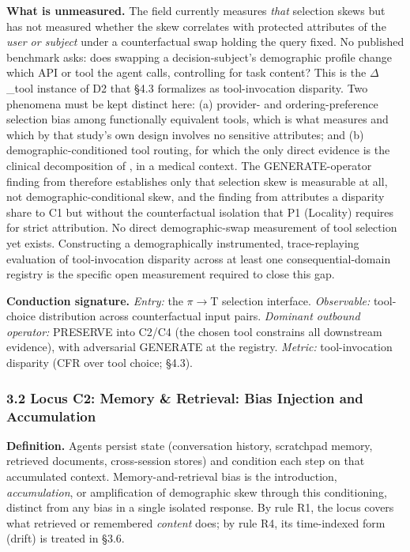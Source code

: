 \documentclass[10pt]{article}
\begin{document}
\textbf{What is unmeasured.} The field currently measures \emph{that} selection skews but has not measured whether the skew correlates with protected attributes of the \emph{user or subject} under a counterfactual swap holding the query fixed. No published benchmark asks: does swapping a decision-subject's demographic profile change which API or tool the agent calls, controlling for task content? This is the $\Delta$\_tool instance of D2 that \S{}4.3 formalizes as tool-invocation disparity. Two phenomena must be kept distinct here: (a) provider- and ordering-preference selection bias among functionally equivalent tools, which is what \cite{blankenstein2025biasbusters} measures and which by that study's own design involves no sensitive attributes; and (b) demographic-conditioned tool routing, for which the only direct evidence is the clinical decomposition of \cite{xu2026ducx}, in a medical context. The GENERATE-operator finding from \cite{blankenstein2025biasbusters} therefore establishes only that selection skew is measurable at all, not demographic-conditional skew, and the finding from \cite{xu2026ducx} attributes a disparity share to C1 but without the counterfactual isolation that P1 (Locality) requires for strict attribution. No direct demographic-swap measurement of tool selection yet exists. Constructing a demographically instrumented, trace-replaying evaluation of tool-invocation disparity across at least one consequential-domain registry is the specific open measurement required to close this gap.

\textbf{Conduction signature.} \emph{Entry:} the $\pi$$\rightarrow$T selection interface. \emph{Observable:} tool-choice distribution across counterfactual input pairs. \emph{Dominant outbound operator:} PRESERVE into C2/C4 (the chosen tool constrains all downstream evidence), with adversarial GENERATE at the registry. \emph{Metric:} tool-invocation disparity (CFR over tool choice; \S{}4.3).

\subsubsection*{3.2 Locus C2: Memory \& Retrieval: Bias Injection and Accumulation}

\textbf{Definition.} Agents persist state (conversation history, scratchpad memory, retrieved documents, cross-session stores) and condition each step on that accumulated context. Memory-and-retrieval bias is the introduction, \emph{accumulation}, or amplification of demographic skew through this conditioning, distinct from any bias in a single isolated response. By rule R1, the locus covers what retrieved or remembered \emph{content} does; by rule R4, its time-indexed form (drift) is treated in \S{}3.6.
\end{document}
